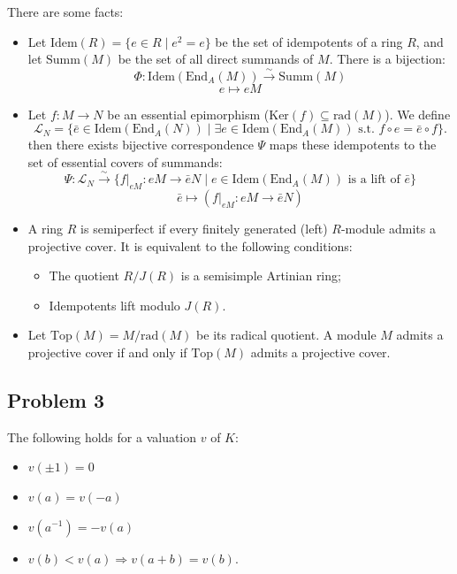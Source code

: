 \begin{remark}
    There are some facts:
    \begin{itemize}
        \item Let $\text{Idem}(R) = \{e \in R \mid e^2 = e\}$ be the set of idempotents of a ring $R$, and let $\text{Summ}(M)$ be the set of all direct summands of $M$. There is a bijection:$$\Phi: \text{Idem}(\text{End}_A(M)) \xrightarrow{\sim} \text{Summ}(M)$$$$e \mapsto eM$$
        \item  Let $f: M \to N$ be an essential epimorphism ($\text{Ker}(f) \subseteq \text{rad}(M)$). We define $$\mathcal{L}_N = \{ \bar{e} \in \text{Idem}(\text{End}_A(N)) \mid \exists e \in \text{Idem}(\text{End}_A(M)) \text{ s.t. } f \circ e = \bar{e} \circ f \}.$$
        then there exists bijective correspondence $\Psi$ maps these idempotents to the set of essential covers of summands: $$\Psi: \mathcal{L}_N \xrightarrow{\sim} \{ f|_{eM} : eM \to \bar{e}N \mid e \in \text{Idem}(\text{End}_A(M)) \text{ is a lift of } \bar{e} \}$$$$\bar{e} \mapsto (f|_{eM} : eM \to \bar{e}N)$$
        \item A ring $R$ is semiperfect if every finitely generated (left) $R$-module admits a projective cover.
        It is equivalent to the following conditions:
        \begin{itemize}
            \item[a] The quotient $R/J(R)$ is a semisimple Artinian ring;
            \item[b] Idempotents lift modulo $J(R)$.
        \end{itemize}
        \item  Let $\text{Top}(M) = M/\text{rad}(M)$ be its radical quotient. A module $M$ admits a projective cover if and only if $\text{Top}(M)$ admits a projective cover.
    \end{itemize}
\end{remark}

\subsection*{Problem 3}
The following holds for a valuation $v$ of $K$:
\begin{itemize}
    \item[(i)] $v(\pm 1) = 0$
    \item[(ii)] $v(a) = v(-a)$
    \item[(iii)] $v(a^{-1}) = -v(a)$
    \item[(iv)] $v(b) < v(a) \Rightarrow v(a + b) = v(b)$.
\end{itemize}

